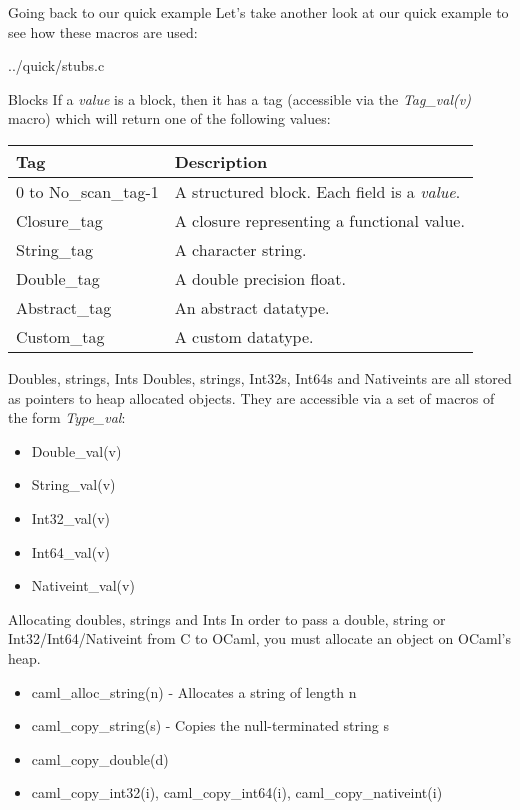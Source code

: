 \documentclass{beamer}
\begin{document}
\begin{frame}[fragile]{Going back to our quick example}
Let's take another look at our quick example to see how these macros are used:
\begin{lstinputlisting}[language=C]{../quick/stubs.c}
\end{lstinputlisting}
\end{frame}

\begin{frame}{Blocks}
If a \emph{value} is a block, then it has a tag (accessible via the \emph{Tag\_val(v)} macro) which will
return one of the following values:
\begin{tabular}{| l | l |} \hline
    Tag & Description \\ \hline\hline
    0 to No\_scan\_tag-1 & A structured block.  Each field is a \emph{value}. \\ \hline
    Closure\_tag & A closure representing a functional value. \\ \hline
    String\_tag & A character string. \\ \hline
    Double\_tag & A double precision float. \\ \hline
    Abstract\_tag & An abstract datatype. \\ \hline
    Custom\_tag & A custom datatype. \\ \hline
\end{tabular}
\end{frame}

\begin{frame}{Doubles, strings, Ints}
Doubles, strings, Int32s, Int64s and Nativeints are all stored as pointers to heap allocated objects.
They are accessible via a set of macros of the form \emph{Type\_val}:
\begin{itemize}
    \item Double\_val(v)
    \item String\_val(v)
    \item Int32\_val(v)
    \item Int64\_val(v)
    \item Nativeint\_val(v)
\end{itemize}
\end{frame}

\begin{frame}{Allocating doubles, strings and Ints}
In order to pass a double, string or Int32/Int64/Nativeint from C to OCaml, you must allocate an
object on OCaml's heap.
\begin{itemize}
    \item caml\_alloc\_string(n) - Allocates a string of length n
    \item caml\_copy\_string(s) - Copies the null-terminated string s
    \item caml\_copy\_double(d)
    \item caml\_copy\_int32(i), caml\_copy\_int64(i), caml\_copy\_nativeint(i)
\end{itemize}
\end{frame}
\end{document}
